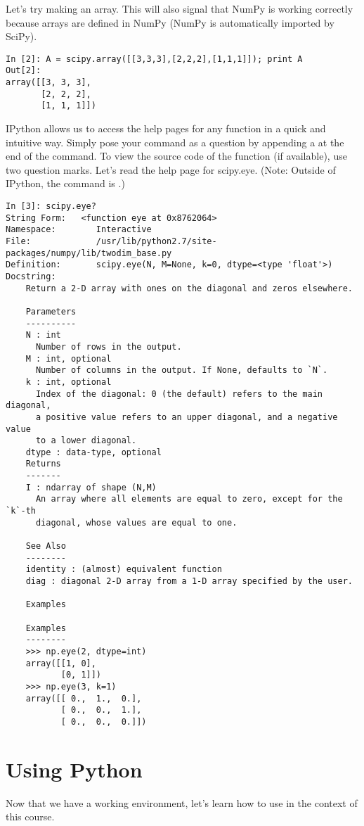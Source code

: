 Let's try making an array.  This will also signal that NumPy is working correctly because arrays are defined in NumPy (NumPy is automatically imported by SciPy).
\begin{lstlisting}[style=python]
In [2]: A = scipy.array([[3,3,3],[2,2,2],[1,1,1]]); print A
Out[2]:
array([[3, 3, 3],
       [2, 2, 2],
       [1, 1, 1]])
\end{lstlisting}

IPython allows us to access the help pages for any function in a quick and intuitive way.  Simply pose your command as a question by appending a  at the end of the command.  To view the source code of the function (if available), use two question marks. Let's read the help page for scipy.eye. (Note: Outside of IPython, the command is .)
\begin{lstlisting}
In [3]: scipy.eye?
String Form:   <function eye at 0x8762064>
Namespace:        Interactive
File:             /usr/lib/python2.7/site-packages/numpy/lib/twodim_base.py
Definition:       scipy.eye(N, M=None, k=0, dtype=<type 'float'>)
Docstring:
    Return a 2-D array with ones on the diagonal and zeros elsewhere.

    Parameters
    ----------
    N : int
      Number of rows in the output.
    M : int, optional
      Number of columns in the output. If None, defaults to `N`.
    k : int, optional
      Index of the diagonal: 0 (the default) refers to the main diagonal,
      a positive value refers to an upper diagonal, and a negative value
      to a lower diagonal.
    dtype : data-type, optional
    Returns
    -------
    I : ndarray of shape (N,M)
      An array where all elements are equal to zero, except for the `k`-th
      diagonal, whose values are equal to one.

    See Also
    --------
    identity : (almost) equivalent function
    diag : diagonal 2-D array from a 1-D array specified by the user.

    Examples

    Examples
    --------
    >>> np.eye(2, dtype=int)
    array([[1, 0],
           [0, 1]])
    >>> np.eye(3, k=1)
    array([[ 0.,  1.,  0.],
           [ 0.,  0.,  1.],
           [ 0.,  0.,  0.]])
\end{lstlisting}

\section*{Using Python}
Now that we have a working environment, let's learn how to use in the context of this course.

